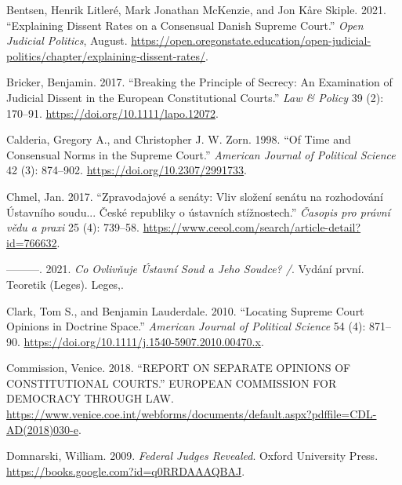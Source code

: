 \documentclass[
  11pt,
]{article}
\newlength{\cslhangindent}
\newenvironment{CSLReferences}[2] %
 {\begin{list}{}{%
  \setlength{\itemindent}{0pt}
  \setlength{\leftmargin}{0pt}
  \setlength{\parsep}{0pt}
  \ifodd #1
   \setlength{\leftmargin}{\cslhangindent}
   \setlength{\itemindent}{-1\cslhangindent}
  \fi
  \setlength{\itemsep}{#2\baselineskip}}}
 {\end{list}}
\begin{document}
\label{refs}
\begin{CSLReferences}{1}{0}
Bentsen, Henrik Litleré, Mark Jonathan McKenzie, and Jon Kåre Skiple. 2021. {``Explaining {Dissent Rates} on a {Consensual Danish Supreme Court}.''} \emph{Open Judicial Politics}, August. \url{https://open.oregonstate.education/open-judicial-politics/chapter/explaining-dissent-rates/}.

Bricker, Benjamin. 2017. {``Breaking the {Principle} of {Secrecy}: {An Examination} of {Judicial Dissent} in the {European Constitutional Courts}.''} \emph{Law \& Policy} 39 (2): 170--91. \url{https://doi.org/10.1111/lapo.12072}.

Calderia, Gregory A., and Christopher J. W. Zorn. 1998. {``Of {Time} and {Consensual Norms} in the {Supreme Court}.''} \emph{American Journal of Political Science} 42 (3): 874--902. \url{https://doi.org/10.2307/2991733}.

Chmel, Jan. 2017. {``Zpravodajové a senáty: Vliv složení senátu na rozhodování Ústavního soudu... České republiky o ústavních stížnostech.''} \emph{Časopis pro právní vědu a praxi} 25 (4): 739--58. \url{https://www.ceeol.com/search/article-detail?id=766632}.

---------. 2021. \emph{Co Ovlivňuje {Ústavní} Soud a Jeho Soudce? /}. Vydání první. Teoretik ({Leges}). Leges,.

Clark, Tom S., and Benjamin Lauderdale. 2010. {``Locating {Supreme Court Opinions} in {Doctrine Space}.''} \emph{American Journal of Political Science} 54 (4): 871--90. \url{https://doi.org/10.1111/j.1540-5907.2010.00470.x}.

Commission, Venice. 2018. {``{REPORT ON SEPARATE OPINIONS OF CONSTITUTIONAL COURTS}.''} EUROPEAN COMMISSION FOR DEMOCRACY THROUGH LAW. \url{https://www.venice.coe.int/webforms/documents/default.aspx?pdffile=CDL-AD(2018)030-e}.

Domnarski, William. 2009. \emph{Federal {Judges Revealed}}. Oxford University Press. \url{https://books.google.com?id=q0RRDAAAQBAJ}.


\end{CSLReferences}
\end{document}
